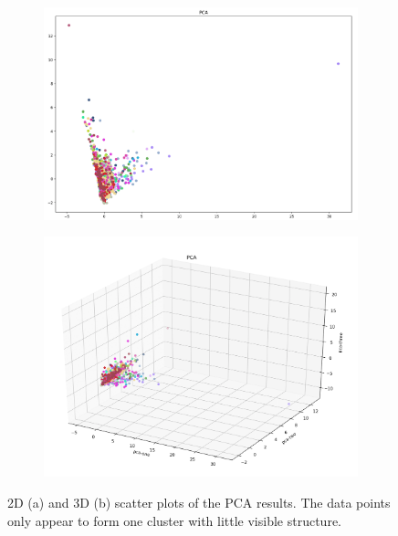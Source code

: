 \begin{figure}[H]
  \centering
  \begin{subfigure}{.475\textwidth}
    \centering
    \includegraphics[width=1\textwidth]{./images/pca2d.png}
  \end{subfigure}%
  \hfill
  \begin{subfigure}{.475\textwidth}
    \centering
    \includegraphics[width=1\textwidth]{./images/pca3d.png}
  \end{subfigure}
	\caption{2D (a) and 3D (b) scatter plots of the PCA results. The data points only appear to form one cluster with little visible structure.}
  \label{figure:PCA}
\end{figure}


